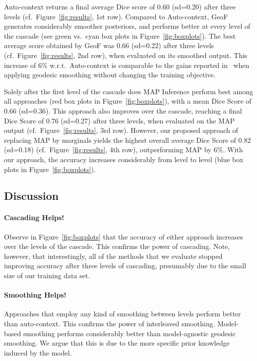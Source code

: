 \documentclass[10pt,twocolumn,letterpaper]{article}
\begin{document}
Auto-context returns a final average Dice score of 0.60 (sd=0.20) after three levels (cf.\ Figure~\ref{fig:results}, 1st row). 
%
Compared to Auto-context, GeoF generates considerably smoother posteriors, and performs better at every level of the cascade (see green vs.\ cyan box plots in Figure~\ref{fig:boxplots}). The best average score obtained by GeoF was 0.66 (sd=0.22) after three levels  (cf.\ Figure~\ref{fig:results}, 2nd row), when evaluated on its smoothed output. This increase of 6\% w.r.t.\ Auto-context is comparable to the gains reported in~\cite{GeoForests2013} when applying geodesic smoothing without changing the training objective.

Solely after the first level of the cascade does MAP Inference perform best among all approaches (red box plots in Figure~\ref{fig:boxplots}), with a mean Dice Score of 0.66 (sd=0.36). This approach also improves over the cascade, reaching a final Dice Score of 0.76 (sd=0.27) after three levels, when evaluated on the MAP output (cf.\ Figure~\ref{fig:results}, 3rd row). 
%
However, our proposed approach of replacing MAP by marginals yields the highest overall average Dice Score of 0.82 (sd=0.18) (cf.\ Figure~\ref{fig:results}, 4th row), outperforming MAP by 6\%. 
%
With our approach, the accuracy increases considerably from level to level (blue box plots in Figure~\ref{fig:boxplots}). 

\subsection{Discussion}

\paragraph{Cascading Helps! }
Observe in Figure~\ref{fig:boxplots} that the accuracy of either approach increases over the levels of the cascade. This confirms the power of cascading. Note, however, that interestingly, all of the methods that we evaluate stopped improving accuracy after three levels of cascading, presumably due to the small size of our training data set.

\paragraph{Smoothing Helps! }
Approaches that employ any kind of smoothing between levels perform better than auto-context. This confirms the power of interleaved smoothing. Model-based smoothing performs considerably better than model-agnostic geodesic smoothing. We argue that this is due to the more specific prior knowledge induced by the model. 
\end{document}
